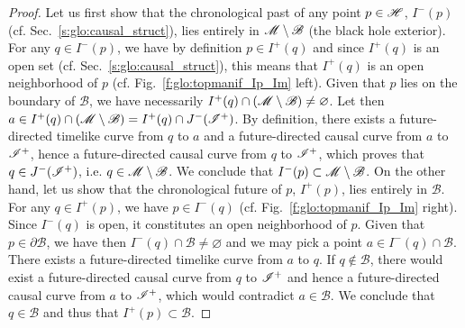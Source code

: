 
\begin{proof}
Let us first show that the chronological past of any point $p\in\mathscr{H}$, $I^-(p)$
(cf. Sec.~\ref{s:glo:causal_struct}), lies entirely in $\mathscr{M}\setminus\mathscr{B}$ (the black
hole exterior).
For any $q\in I^-(p)$, we have by definition $p\in I^+(q)$
and since $I^+(q)$ is an open set (cf. Sec.~\ref{s:glo:causal_struct}), this means that
$I^+(q)$ is an open neighborhood of $p$ (cf. Fig.~\ref{f:glo:topmanif_Ip_Im} left). Given that $p$ lies on the boundary
of $\mathscr{B}$, we have necessarily $I^+(q)\cap (\mathscr{M}\setminus\mathscr{B}) \neq \varnothing$.
Let then $a\in I^+(q)\cap (\mathscr{M}\setminus\mathscr{B}) = I^+(q)\cap J^-(\mathscr{I}^+)$.
By definition, there exists a future-directed timelike curve from $q$ to $a$ and a future-directed causal curve from $a$ to
$\mathscr{I}^+$, hence a future-directed causal curve from $q$ to $\mathscr{I}^+$, which proves that
$q\in J^-(\mathscr{I}^+)$, i.e. $q\in \mathscr{M}\setminus\mathscr{B}$. We conclude that
$I^-(p)\subset \mathscr{M}\setminus\mathscr{B}$.
On the other hand, let us show that the chronological future of $p$, $I^+(p)$,
lies entirely in $\mathscr{B}$. For any $q\in I^+(p)$,  we have $p\in I^-(q)$  (cf. Fig.~\ref{f:glo:topmanif_Ip_Im} right). Since $I^-(q)$ is open, it constitutes an open neighborhood of $p$. Given that $p\in\partial\mathscr{B}$, we have
then $I^-(q) \cap \mathscr{B} \neq \varnothing$ and we may pick a point
$a\in I^-(q) \cap \mathscr{B}$. There exists a future-directed timelike curve from $a$ to $q$.
If $q\not\in\mathscr{B}$, there would exist a future-directed causal curve from $q$ to $\mathscr{I}^+$
and hence a future-directed causal curve from $a$ to $\mathscr{I}^+$, which would contradict
$a\in\mathscr{B}$. We conclude that $q\in\mathscr{B}$ and thus that $I^+(p)\subset\mathscr{B}$.


\end{proof}
